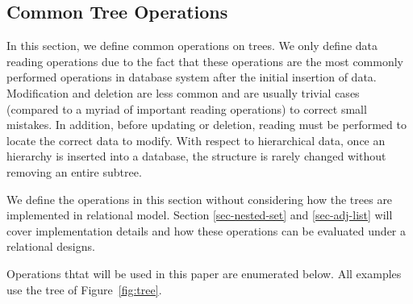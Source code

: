 \subsection{Common Tree Operations}

In this section, we define common operations on trees. We only define data reading operations due to the fact that these operations are the most commonly performed operations in database system after the initial insertion of data. Modification and deletion are less common and are usually trivial cases (compared to a myriad of important reading operations) to correct small mistakes. In addition, before updating or deletion, reading must be performed to locate the correct data to modify. With respect to hierarchical data, once an hierarchy is inserted into a database, the structure is rarely changed without removing an entire subtree.

We define the operations in this section without considering how the trees are implemented in relational model. Section \ref{sec-nested-set} and \ref{sec-adj-list} will cover implementation details and how these operations can be evaluated under a relational designs.


Operations thtat will be used in this paper are enumerated below. All examples use the tree of Figure~\ref{fig:tree}.



